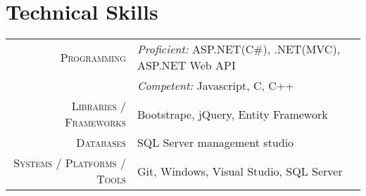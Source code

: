 \documentclass[a4paper,10pt]{extarticle} %
\begin{document}
	
	
	\section{\textcolor{primary}{Technical Skills}}
	\vspace{0.1cm}
	\begin{tabular}{r|p{15cm}}
		
		\textsc{Programming} & \textit{Proficient:} ASP.NET(C\#), .NET(MVC), ASP.NET Web API\\
		& \textit{Competent:} Javascript, C, C++ \\
		\textsc{Libraries / Frameworks} & Bootstrape, jQuery, Entity Framework \\
		\textsc{Databases} & SQL Server management studio\\
		\textsc{Systems / Platforms / Tools} & Git, Windows, Visual Studio, SQL Server\\
		
	\end{tabular}
	
	
	\vspace{0.2cm}
	
	
\end{document}
